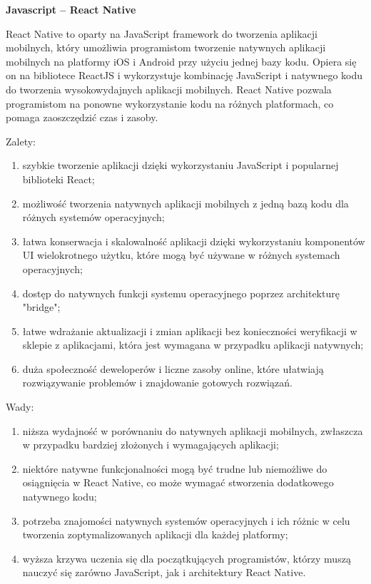 \documentclass[12pt, a4paper, twoside, openany]{book}
\begin{document}
\textbf{Javascript -- React Native\\}

React Native to oparty na JavaScript framework do tworzenia aplikacji mobilnych, który umożliwia programistom tworzenie natywnych aplikacji mobilnych na platformy iOS i Android przy użyciu jednej bazy kodu.
Opiera się on na bibliotece ReactJS i wykorzystuje kombinację JavaScript i natywnego kodu do tworzenia wysokowydajnych aplikacji mobilnych.
React Native pozwala programistom na ponowne wykorzystanie kodu na różnych platformach, co pomaga zaoszczędzić czas i zasoby.

Zalety:
\begin{enumerate}[label=--]
    \item szybkie tworzenie aplikacji dzięki wykorzystaniu JavaScript i popularnej biblioteki React;
    \item możliwość tworzenia natywnych aplikacji mobilnych z jedną bazą kodu dla różnych systemów operacyjnych;
    \item łatwa konserwacja i skalowalność aplikacji dzięki wykorzystaniu komponentów UI wielokrotnego użytku, które mogą być używane w różnych systemach operacyjnych;
    \item dostęp do natywnych funkcji systemu operacyjnego poprzez architekturę "bridge";
    \item łatwe wdrażanie aktualizacji i zmian aplikacji bez konieczności weryfikacji w sklepie z aplikacjami, która jest wymagana w przypadku aplikacji natywnych;
    \item duża społeczność deweloperów i liczne zasoby online, które ułatwiają rozwiązywanie problemów i znajdowanie gotowych rozwiązań.
\end{enumerate}

Wady:
\begin{enumerate}[label=--]
    \item niższa wydajność w porównaniu do natywnych aplikacji mobilnych, zwłaszcza w przypadku bardziej złożonych i wymagających aplikacji;
    \item niektóre natywne funkcjonalności mogą być trudne lub niemożliwe do osiągnięcia w React Native, co może wymagać stworzenia dodatkowego natywnego kodu;
    \item potrzeba znajomości natywnych systemów operacyjnych i ich różnic w celu tworzenia zoptymalizowanych aplikacji dla każdej platformy;
    \item wyższa krzywa uczenia się dla początkujących programistów, którzy muszą nauczyć się zarówno JavaScript, jak i architektury React Native.
\end{enumerate}
\end{document}
